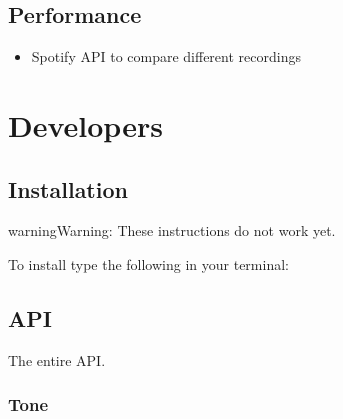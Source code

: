 \documentclass[letterpaper,10pt,english]{sphinxmanual}
\begin{document}
\section{Performance}
\label{\detokenize{3_advanced:performance}}\begin{itemize}
\item {} 
Spotify API to compare different recordings

\end{itemize}


\chapter{Developers}
\label{\detokenize{index:developers}}

\section{Installation}
\label{\detokenize{install:installation}}\label{\detokenize{install::doc}}
\begin{sphinxadmonition}{warning}{Warning:}
These instructions do not work yet.
\end{sphinxadmonition}

To install  type the following in your terminal:

\begin{sphinxVerbatim}[commandchars=\\\{\}]
  
\end{sphinxVerbatim}


\section{API}
\label{\detokenize{api:api}}\label{\detokenize{api::doc}}
The entire  API.


\subsection{Tone}
\label{\detokenize{api:tone}}
\end{document}
